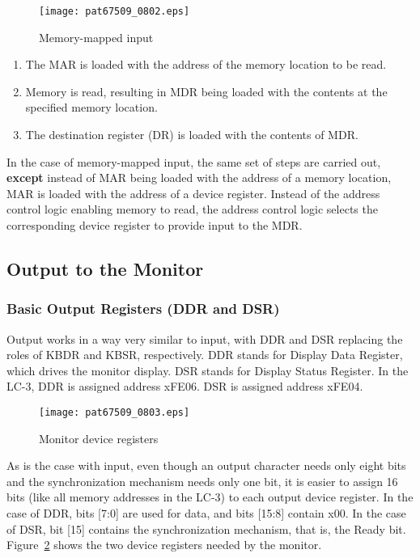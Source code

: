 \documentclass{patt}
\begin{document}
\begin{figure}[h!]
\centerline{\texttt{[image: pat67509\_0802.eps]}}
\caption{Memory-mapped input}
\label{fig:memmap.input}
\end{figure}

\begin{enumerate}
\item The MAR is loaded with the address of the memory location to be
  read.
\item Memory is read, resulting in MDR being loaded with the contents
  at the specified memory location.
\item The destination register (DR) is loaded with the contents of
  MDR.
\end{enumerate}
In the case of memory-mapped input, the same set of steps are carried
out, {\bf except} instead of MAR being loaded with the address of a
memory location, MAR is loaded with the address of a device register.
Instead of the {address control logic} enabling memory to read, the
address control logic selects the corresponding device register to
provide input to the MDR.

\FloatBarrier
\subsection{Output to the Monitor}
\label{subsec:output.to.monitor}

\subsubsection{Basic Output Registers (DDR and DSR)}

 Output works in a way very similar to input, with DDR and
DSR replacing the roles of KBDR and KBSR, respectively.  DDR stands
for Display Data Register, which drives the monitor display.  DSR
stands for Display Status Register.  In the LC-3, DDR is assigned
address xFE06.  DSR is assigned address xFE04.

\begin{figure}[h!]
\centerline{\texttt{[image: pat67509\_0803.eps]}}
\caption{Monitor device registers}
\label{fig:crtdr}
\end{figure}

As is the case with input, even though an output character needs only
eight bits and the synchronization mechanism needs only one bit, it is
easier to assign 16 bits (like all memory addresses in the LC-3) to
each output device register.  In the case of DDR, bits [7:0] are used
for data, and bits [15:8] contain x00. In the case of DSR, bit [15]
contains the synchronization mechanism, that is, the Ready bit.
Figure~\ref{fig:crtdr} shows the two device registers needed by the
monitor.
\end{document}
